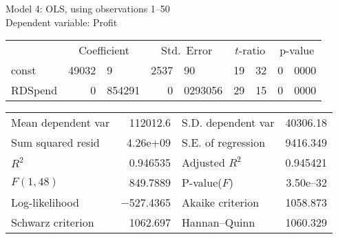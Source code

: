 \documentclass[11pt]{article}
\begin{document}
\thispagestyle{empty}

\begin{center}

Model 4: OLS, using observations 1--50\\
Dependent variable: Profit\\

\vspace{1em}

\begin{tabular}{lr@{.}lr@{.}lr@{.}lr@{.}l}
  &
 \multicolumn{2}{c}{Coefficient} &
  \multicolumn{2}{c}{Std.\ Error} &
   \multicolumn{2}{c}{$t$-ratio} &
    \multicolumn{2}{c}{p-value} \\[1ex]
const &
  49032&9 &
    2537&90 &
      19&32 &
        0&0000 \\
RDSpend &
  0&854291 &
    0&0293056 &
      29&15 &
        0&0000 \\
\end{tabular}

\vspace{1ex}
\begin{tabular}{lrlr}
Mean dependent var &  112012.6 & S.D. dependent var &  40306.18 \\
Sum squared resid &  4.26\textrm{e+09} & S.E. of regression &  9416.349 \\
$R^2$ &  0.946535 & Adjusted $R^2$ &  0.945421 \\
$F(1, 48)$ &  849.7889 & P-value($F$) &  3.50\textrm{e--32} \\
Log-likelihood & $-$527.4365 & Akaike criterion &  1058.873 \\
Schwarz criterion &  1062.697 & Hannan--Quinn &  1060.329 \\
\end{tabular}


\end{center}
\end{document}
